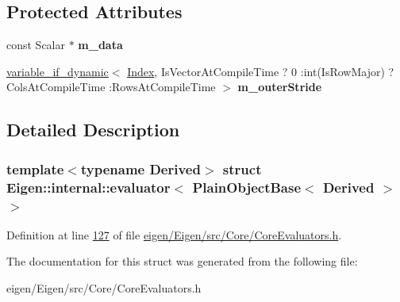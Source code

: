 \subsection*{Protected Attributes}
\begin{DoxyCompactItemize}
\item 
\mbox{\label{struct_eigen_1_1internal_1_1evaluator_3_01_plain_object_base_3_01_derived_01_4_01_4_acc20af4caeb3d9e41a24f585fe65d422}} 
const Scalar $\ast$ {\bfseries m\+\_\+data}
\item 
\mbox{\label{struct_eigen_1_1internal_1_1evaluator_3_01_plain_object_base_3_01_derived_01_4_01_4_a9f00be2202272fb5c7f0f03b95d7b2c5}} 
\hyperlink{class_eigen_1_1internal_1_1variable__if__dynamic}{variable\+\_\+if\+\_\+dynamic}$<$ \hyperlink{namespace_eigen_a62e77e0933482dafde8fe197d9a2cfde}{Index}, Is\+Vector\+At\+Compile\+Time ? 0 \+:int(Is\+Row\+Major) ? Cols\+At\+Compile\+Time \+:Rows\+At\+Compile\+Time $>$ {\bfseries m\+\_\+outer\+Stride}
\end{DoxyCompactItemize}


\subsection{Detailed Description}
\subsubsection*{template$<$typename Derived$>$\newline
struct Eigen\+::internal\+::evaluator$<$ Plain\+Object\+Base$<$ Derived $>$ $>$}



Definition at line \hyperlink{eigen_2_eigen_2src_2_core_2_core_evaluators_8h_source_l00127}{127} of file \hyperlink{eigen_2_eigen_2src_2_core_2_core_evaluators_8h_source}{eigen/\+Eigen/src/\+Core/\+Core\+Evaluators.\+h}.



The documentation for this struct was generated from the following file\+:\begin{DoxyCompactItemize}
\item 
eigen/\+Eigen/src/\+Core/\+Core\+Evaluators.\+h\end{DoxyCompactItemize}
